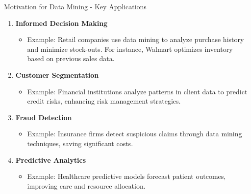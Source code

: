 \documentclass[aspectratio=169]{beamer}
\begin{document}
\begin{frame}[fragile]{Motivation for Data Mining - Key Applications}
    \begin{enumerate}
        \item \textbf{Informed Decision Making}
            \begin{itemize}
                \item Example: Retail companies use data mining to analyze purchase history and minimize stock-outs. For instance, Walmart optimizes inventory based on previous sales data.
            \end{itemize}

        \item \textbf{Customer Segmentation}
            \begin{itemize}
                \item Example: Financial institutions analyze patterns in client data to predict credit risks, enhancing risk management strategies.
            \end{itemize}

        \item \textbf{Fraud Detection}
            \begin{itemize}
                \item Example: Insurance firms detect suspicious claims through data mining techniques, saving significant costs.
            \end{itemize}

        \item \textbf{Predictive Analytics}
            \begin{itemize}
                \item Example: Healthcare predictive models forecast patient outcomes, improving care and resource allocation.
            \end{itemize}
    \end{enumerate}
\end{frame}
\end{document}
